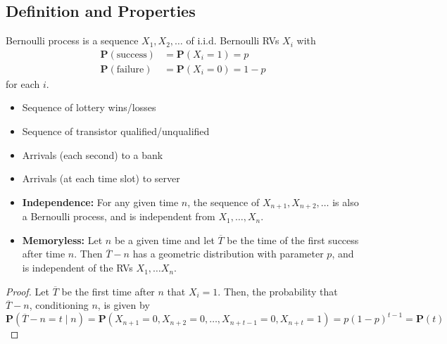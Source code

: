 \documentclass[device=normal, lang=en]{elegantbook}
\numberwithin{equation}{section}
\begin{document}
\subsection{Definition and Properties}
\begin{definition}
    Bernoulli process is a sequence $X_1, X_2, \ldots$ of i.i.d. Bernoulli RVs $X_i$ with
    \begin{equation}
    \begin{aligned}
        \mathbf{P}(\text{success}) &= \mathbf{P}(X_i = 1) = p \\ 
        \mathbf{P}(\text{failure}) &= \mathbf{P}(X_i = 0) = 1 - p 
    \end{aligned}
    \end{equation}
    for each $i$.
\end{definition}
\begin{example}
    \begin{itemize}
        \item Sequence of lottery wins/losses
        \item Sequence of transistor qualified/unqualified
        \item Arrivals (each second) to a bank
        \item Arrivals (at each time slot) to server
    \end{itemize}
\end{example}
\begin{property}
    \begin{itemize}
        \item \textbf{Independence:} For any given time $n$, the sequence of $X_{n+1}, X_{n+2}, \ldots$ is also a Bernoulli process, and is independent from $X_1, \ldots , X_n$.
        \item \textbf{Memoryless:}  Let $n$ be a given time and let $\overline{T}$ be the time of the first success after time $n$. Then $\overline{T} - n$ has a geometric distribution with parameter $p$, and is independent of the RVs $X_1, \ldots X_n$.
    \end{itemize}
\end{property}
\begin{proof}
    Let $\overline{T}$ be the first time after $n$ that $X_i = 1$. Then, the probability that $\overline{T} - n$, conditioning $n$, is given by
    \begin{equation}
        \mathbf{P}(\overline{T} - n = t \mid n) = \mathbf{P}(X_{n+1} = 0, X_{n+2} = 0, \ldots, X_{n+t-1} = 0, X_{n+t} = 1) = p(1-p)^{t-1} = \mathbf{P}(t)
    \end{equation}
\end{proof}
\end{document}
